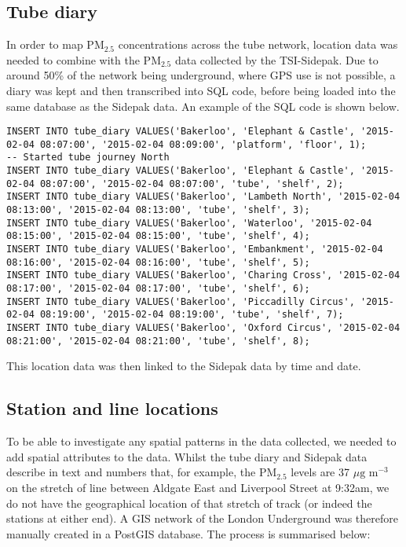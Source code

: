 \subsection{Tube diary}
\label{tube_diary}
In order to map PM$_{2.5}$ concentrations across the tube network, location data was needed to combine with the PM$_{2.5}$ data collected by the TSI-Sidepak. Due to around 50\% of the network being underground, where GPS use is not possible, a diary was kept and then transcribed into SQL code, before being loaded into the same database as the Sidepak data. An example of the SQL code is shown below.

\begin{lstlisting}
INSERT INTO tube_diary VALUES('Bakerloo', 'Elephant & Castle', '2015-02-04 08:07:00', '2015-02-04 08:09:00', 'platform', 'floor', 1);
-- Started tube journey North
INSERT INTO tube_diary VALUES('Bakerloo', 'Elephant & Castle', '2015-02-04 08:07:00', '2015-02-04 08:07:00', 'tube', 'shelf', 2);
INSERT INTO tube_diary VALUES('Bakerloo', 'Lambeth North', '2015-02-04 08:13:00', '2015-02-04 08:13:00', 'tube', 'shelf', 3);
INSERT INTO tube_diary VALUES('Bakerloo', 'Waterloo', '2015-02-04 08:15:00', '2015-02-04 08:15:00', 'tube', 'shelf', 4);
INSERT INTO tube_diary VALUES('Bakerloo', 'Embankment', '2015-02-04 08:16:00', '2015-02-04 08:16:00', 'tube', 'shelf', 5);
INSERT INTO tube_diary VALUES('Bakerloo', 'Charing Cross', '2015-02-04 08:17:00', '2015-02-04 08:17:00', 'tube', 'shelf', 6);
INSERT INTO tube_diary VALUES('Bakerloo', 'Piccadilly Circus', '2015-02-04 08:19:00', '2015-02-04 08:19:00', 'tube', 'shelf', 7);
INSERT INTO tube_diary VALUES('Bakerloo', 'Oxford Circus', '2015-02-04 08:21:00', '2015-02-04 08:21:00', 'tube', 'shelf', 8);
\end{lstlisting}

This location data was then linked to the Sidepak data by time and date.

\subsection{Station and line locations}
To be able to investigate any spatial patterns in the data collected, we needed to add spatial attributes to the data. Whilst the tube diary and Sidepak data describe in text and numbers that, for example, the PM$_{2.5}$ levels are 37 $\mu \text{g m}^{-3}$ on the stretch of line between Aldgate East and Liverpool Street at 9:32am, we do not have the geographical location of that stretch of track (or indeed the stations at either end). A GIS network of the London Underground was therefore manually created in a PostGIS database. The process is summarised below:

